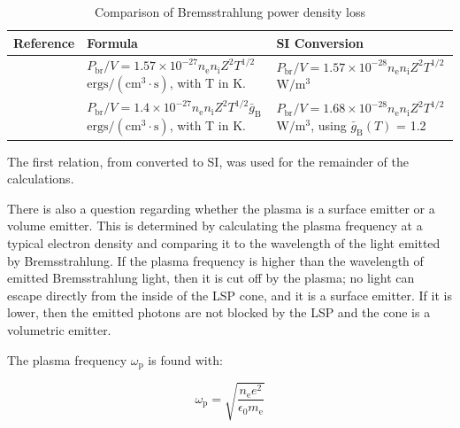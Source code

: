         \begin{table}[!ht]
            \footnotesize
            \centering
            \caption{Comparison of Bremsstrahlung power density loss}
            \label{tab:Brems_compare}
            \begin{tabularx}{\textwidth}{@{}lX<{\raggedright}@{}X<{\raggedright}@{}}
            \toprule
            Reference & Formula & SI Conversion \\ \midrule
            \textcite{glasstoneControlledThermonuclearReactions1975}  & $P_\mathrm{br}/V = 1.57 \times 10^{-27} n_\mathrm{e} n_\mathrm{i} Z^2 T^{1/2}$ \: $\mathrm{ergs/(cm^3\cdot s)}$, with T in K. &   $P_\mathrm{br}/V = 1.57 \times 10^{-28} n_\mathrm{e} n_\mathrm{i} Z^2 T^{1/2}$ \: $\mathrm{W/m^3}$  \\
            \textcite{rybickiRadiativeProcessesAstrophysics2004}      & $P_\mathrm{br}/V = 1.4 \times 10^{-27} n_\mathrm{e} n_\mathrm{i} Z^2 T^{1/2} \bar{g}_\mathrm{B}$ \: $\mathrm{ergs/(cm^3\cdot s)}$, with T in K.&  $P_\mathrm{br}/V = 1.68 \times 10^{-28} n_\mathrm{e} n_\mathrm{i} Z^2 T^{1/2}$ \:  $\mathrm{W/m^3}$, using $\bar{g}_\mathrm{B} (T)$ = 1.2\\
            \bottomrule          
            \end{tabularx}
        \end{table}

        The first relation, from \textcite{glasstoneControlledThermonuclearReactions1975} converted to SI, was used for the remainder of the calculations.

        There is also a question regarding whether the plasma is a surface emitter or a volume emitter. This is determined by calculating the plasma frequency at a typical electron density and comparing it to the wavelength of the light emitted by Bremsstrahlung. If the plasma frequency is higher than the wavelength of emitted Bremsstrahlung light, then it is cut off by the plasma; no light can escape directly from the inside of the LSP cone, and it is a surface emitter. If it is lower, then the emitted photons are not blocked by the LSP and the cone is a volumetric emitter.
        
        The plasma frequency $\omega_\mathrm{p}$ is found with: 

        \begin{equation}
            \omega_\mathrm{p} = \sqrt{\frac{n_\mathrm{e} e^2}{\epsilon_\mathrm{0} m_\mathrm{e}}}
        \end{equation}

